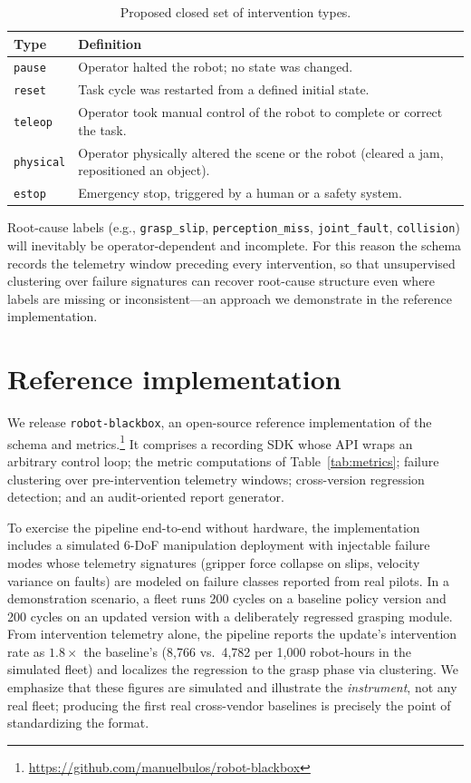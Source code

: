 \documentclass[11pt]{article}
\begin{document}
\begin{table}[h]
\centering
\small
\begin{tabular}{@{}lp{9.5cm}@{}}
\toprule
\textbf{Type} & \textbf{Definition} \\
\midrule
\texttt{pause}    & Operator halted the robot; no state was changed. \\
\texttt{reset}    & Task cycle was restarted from a defined initial state. \\
\texttt{teleop}   & Operator took manual control of the robot to complete
                    or correct the task. \\
\texttt{physical} & Operator physically altered the scene or the robot
                    (cleared a jam, repositioned an object). \\
\texttt{estop}    & Emergency stop, triggered by a human or a safety system. \\
\bottomrule
\end{tabular}
\caption{Proposed closed set of intervention types.}
\label{tab:taxonomy}
\end{table}

Root-cause labels (e.g., \texttt{grasp\_slip}, \texttt{perception\_miss},
\texttt{joint\_fault}, \texttt{collision}) will inevitably be
operator-dependent and incomplete. For this reason the schema records the
telemetry window preceding every intervention, so that unsupervised
clustering over failure signatures can recover root-cause structure even
where labels are missing or inconsistent---an approach we demonstrate in
the reference implementation.

\section{Reference implementation}
\label{sec:implementation}

We release \texttt{robot-blackbox}, an open-source reference implementation
of the schema and metrics.\footnote{\url{https://github.com/manuelbulos/robot-blackbox}}
It comprises a recording SDK whose API wraps an arbitrary control loop; the
metric computations of Table~\ref{tab:metrics}; failure clustering over
pre-intervention telemetry windows; cross-version regression detection; and
an audit-oriented report generator.

To exercise the pipeline end-to-end without hardware, the implementation
includes a simulated 6-DoF manipulation deployment with injectable failure
modes whose telemetry signatures (gripper force collapse on slips, velocity
variance on faults) are modeled on failure classes reported from real
pilots. In a demonstration scenario, a fleet runs 200 cycles on a baseline
policy version and 200 cycles on an updated version with a deliberately
regressed grasping module. From intervention telemetry alone, the pipeline
reports the update's intervention rate as $1.8\times$ the baseline's
(8{,}766 vs.\ 4{,}782 per 1,000 robot-hours in the simulated fleet) and
localizes the regression to the grasp phase via clustering. We emphasize
that these figures are simulated and illustrate the \emph{instrument},
not any real fleet; producing the first real cross-vendor baselines is
precisely the point of standardizing the format.
\end{document}
